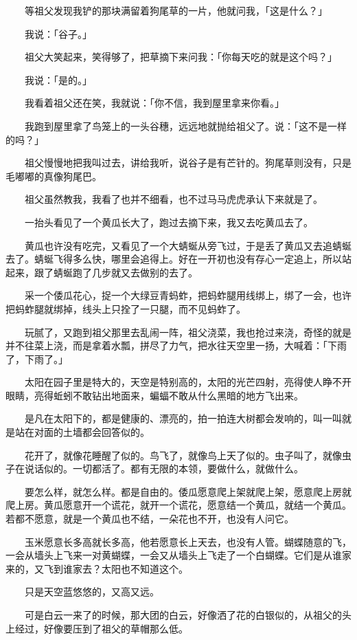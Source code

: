 \documentclass[UTF8]{ctexart}
\begin{document}
　　等祖父发现我铲的那块满留着狗尾草的一片，他就问我，「这是什么？」

　　我说：「谷子。」

　　祖父大笑起来，笑得够了，把草摘下来问我：「你每天吃的就是这个吗？」

　　我说：「是的。」

　　我看着祖父还在笑，我就说：「你不信，我到屋里拿来你看。」

　　我跑到屋里拿了鸟笼上的一头谷穗，远远地就抛给祖父了。说：「这不是一样的吗？」

　　祖父慢慢地把我叫过去，讲给我听，说谷子是有芒针的。狗尾草则没有，只是毛嘟嘟的真像狗尾巴。

　　祖父虽然教我，我看了也并不细看，也不过马马虎虎承认下来就是了。

　　一抬头看见了一个黄瓜长大了，跑过去摘下来，我又去吃黄瓜去了。

　　黄瓜也许没有吃完，又看见了一个大蜻蜒从旁飞过，于是丢了黄瓜又去追蜻蜒去了。蜻蜒飞得多么快，哪里会追得上。好在一开初也没有存心一定追上，所以站起来，跟了蜻蜒跑了几步就又去做别的去了。

　　采一个倭瓜花心，捉一个大绿豆青蚂蚱，把蚂蚱腿用线绑上，绑了一会，也许把蚂蚱腿就绑掉，线头上只拴了一只腿，而不见蚂蚱了。

　　玩腻了，又跑到祖父那里去乱闹一阵，祖父浇菜，我也抢过来浇，奇怪的就是并不往菜上浇，而是拿着水瓢，拼尽了力气，把水往天空里一扬，大喊着：「下雨了，下雨了。」

　　太阳在园子里是特大的，天空是特别高的，太阳的光芒四射，亮得使人睁不开眼睛，亮得蚯蚓不敢钻出地面来，蝙蝠不敢从什么黑暗的地方飞出来。

　　是凡在太阳下的，都是健康的、漂亮的，拍一拍连大树都会发响的，叫一叫就是站在对面的土墙都会回答似的。

　　花开了，就像花睡醒了似的。鸟飞了，就像鸟上天了似的。虫子叫了，就像虫子在说话似的。一切都活了。都有无限的本领，要做什么，就做什么。

　　要怎么样，就怎么样。都是自由的。倭瓜愿意爬上架就爬上架，愿意爬上房就爬上房。黄瓜愿意开一个谎花，就开一个谎花，愿意结一个黄瓜，就结一个黄瓜。若都不愿意，就是一个黄瓜也不结，一朵花也不开，也没有人问它。

　　玉米愿意长多高就长多高，他若愿意长上天去，也没有人管。蝴蝶随意的飞，一会从墙头上飞来一对黄蝴蝶，一会又从墙头上飞走了一个白蝴蝶。它们是从谁家来的，又飞到谁家去？太阳也不知道这个。

　　只是天空蓝悠悠的，又高又远。

　　可是白云一来了的时候，那大团的白云，好像洒了花的白银似的，从祖父的头上经过，好像要压到了祖父的草帽那么低。
\end{document}
